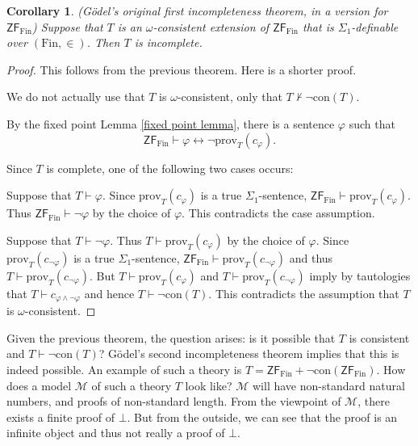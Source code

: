 \documentclass[a4paper, 11pt]{amsart}
\newtheorem{corollary}[corollary]{Corollary}
\theoremstyle{remark}
\newcommand{\axiomft}[1]{\mathsf{#1}}
\newcommand{\ZF}{\axiomft{ZF}}
\newcommand{\Fin}{\mathrm{Fin}}
\newcommand{\prov}{\mathrm{prov}}
\newcommand{\cM}{\mathcal M}
\begin{document}
\begin{corollary}(G\"odel's original first incompleteness theorem, in a version for $\ZF_\Fin$) 
Suppose that $T$ is an $\omega$-consistent extension of $\ZF_\Fin$ that is $\Sigma_1$-definable over $(\Fin,\in)$. 
Then $T$ is incomplete. 
\end{corollary} 
\begin{proof} 
This follows from the previous theorem. Here is a shorter proof. 

We do not actually use that $T$ is $\omega$-consistent, only that $T\not\vdash \neg\mathrm{con}(T)$. 

By the fixed point Lemma \ref{fixed point lemma}, there is a sentence $\varphi$ such that 
$$ \ZF_\Fin  \vdash  \varphi \longleftrightarrow  \neg\prov_T(c_\varphi).  $$ 

Since $T$ is complete, one of the following two cases occurs: 

Suppose that $T\vdash \varphi$. 
Since $\prov_T(c_\varphi)$ is a true $\Sigma_1$-sentence, $\ZF_\Fin\vdash\prov_T(c_\varphi) $. 
Thus  $\ZF_\Fin\vdash\neg\varphi$ by the choice of $\varphi$. 
This contradicts the case assumption. 

Suppose that $T\vdash\neg\varphi$. 
Thus  $T\vdash \prov_T(c_\varphi)$ by the choice of $\varphi$. 
Since $\prov_T(c_{\neg\varphi})$ is a true $\Sigma_1$-sentence, $\ZF_\Fin\vdash\prov_T(c_{\neg\varphi})$ and thus $T\vdash\prov_T(c_{\neg\varphi})$. 
But $T\vdash \prov_T(c_\varphi)$ and $T\vdash\prov_T(c_{\neg\varphi})$ imply by tautologies that $T\vdash c_{\varphi \wedge \neg\varphi}$ and hence $T\vdash \neg\mathrm{con}(T)$. 
This contradicts the assumption that $T$ is $\omega$-consistent. 
\end{proof} 


Given the previous theorem, the question arises: is it possible that $T$ is consistent and $T\vdash \neg\mathrm{con}(T)$? 
G\"odel's second incompleteness theorem implies that this is indeed possible. 
An example of such a theory is $T=\ZF_\Fin + \neg\mathrm{con}(\ZF_\Fin)$. 
How does a model $\cM$ of such a theory $T$ look like? 
$\cM$ will have non-standard natural numbers, and proofs of non-standard length. 
From the viewpoint of $\cM$, there exists a finite proof of $\bot$. 
But from the outside, we can see that the proof is an infinite object and thus not really a proof of $\bot$. 
\end{document}
